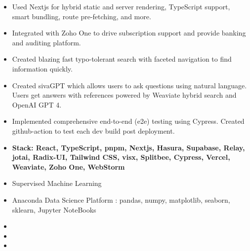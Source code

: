 \documentclass[10pt,a4paper,ragged2e,withhyper]{altacv}
\begin{document}
\begin{paracol}{2}
\begin{itemize}
\item Used Nextjs for hybrid static and server rendering, TypeScript support, smart bundling, route pre-fetching, and more.
\item Integrated with Zoho One to drive subscription support and provide banking and auditing platform.
\item Created blazing fast typo-tolerant search with faceted navigation to find information quickly.
\item Created sivaGPT which allows users to ask questions using natural language.
      Users get answers with references powered by Weaviate hybrid search and OpenAI GPT 4.
\item Implemented comprehensive end-to-end (e2e) testing using Cypress.
      Created github-action to test each dev build post deployment.
\item \textbf{Stack: React, TypeScript, pnpm, Nextjs, Hasura, Supabase, Relay, jotai, Radix-UI, Tailwind CSS, visx, Splitbee, Cypress, Vercel, Weaviate, Zoho One, WebStorm}
\end{itemize}

\bigskip

\medskip
{}
\begin{itemize}
\smallskip
\item Supervised Machine Learning
\item Anaconda Data Science Platform : pandas, numpy, matplotlib, seaborn, sklearn, Jupyter NoteBooks
\end{itemize}


\bigskip
{}
\begin{itemize}
\item{}
\smallskip
\item{}
\smallskip
\item{}
\end{itemize}








\end{paracol}
\end{document}
